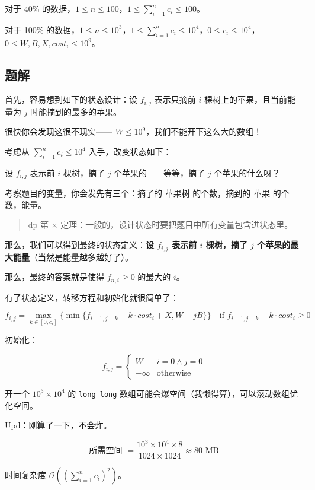 \documentclass{article}
\begin{document}
	对于 40\% 的数据，$1\le n\le 100$，$\displaystyle 1\le \sum_{i=1}^{n} c_{i} \le 100$。
	
	对于 100\% 的数据，$1\le n\le 10^{3}$，$\displaystyle 1\le \sum_{i=1}^n c_{i} \le 10^{4}$，$0\le c_{i}\le 10^{4}$，$0\le W,B,X,cost_{i}\le 10^{9}$。

	\subsection{题解}

	首先，容易想到如下的状态设计：设 $f_{i,j}$ 表示只摘前 $i$ 棵树上的苹果，且当前能量为 $j$ 时能摘到的最多的苹果。

	很快你会发现这很不现实—— $W\le 10^9$，我们不能开下这么大的数组！

	考虑从 $\displaystyle\sum_{i=1}^n c_i\le 10^4$ 入手，改变状态如下：

	设 $f_{i,j}$ 表示前 $i$ 棵树，摘了 $j$ 个苹果的——等等，摘了 $j$ 个苹果的什么呀？

	考察题目的变量，你会发先有三个：摘了的 苹果树 的个数，摘到的 苹果 的个数，能量。

	\begin{quote}
		dp 第 $\times$ 定理：一般的，设计状态时要把题目中所有变量包含进状态里。
	\end{quote}

	那么，我们可以得到最终的状态定义：\textbf{设 $f_{i,j}$ 表示前 $i$ 棵树，摘了 $j$ 个苹果的最大能量}（当然是能量越多越好了）。

	那么，最终的答案就是使得 $f_{n,i}\ge 0$ 的最大的 $i$。

	有了状态定义，转移方程和初始化就很简单了：

	\[
		f_{i,j}=\max_{k\in[0,c_i]}\{\min\{f_{i-1,j-k}-k\cdot cost_i+X,W+jB\}\}\quad\text{if }f_{i-1,j-k}-k\cdot cost_i \ge 0
	\]

	初始化：

	\[
		f_{i,j}=\begin{cases}W&i=0\land j=0\\-\infty&\text{otherwise}\end{cases}
	\]

	开一个 $10^3\times 10^4$ 的 \texttt{long long} 数组可能会爆空间（我懒得算），可以滚动数组优化空间。

	Upd：刚算了一下，不会炸。

	\[
		\text{所需空间 }=\frac{10^{3}\times 10^{4}\times 8}{1024\times 1024}\approx 80\text{ MB}
	\]

	时间复杂度 $\displaystyle\mathcal O\left(\left(\sum_{i=1}^n c_{i}\right)^2\right)$。
\end{document}
